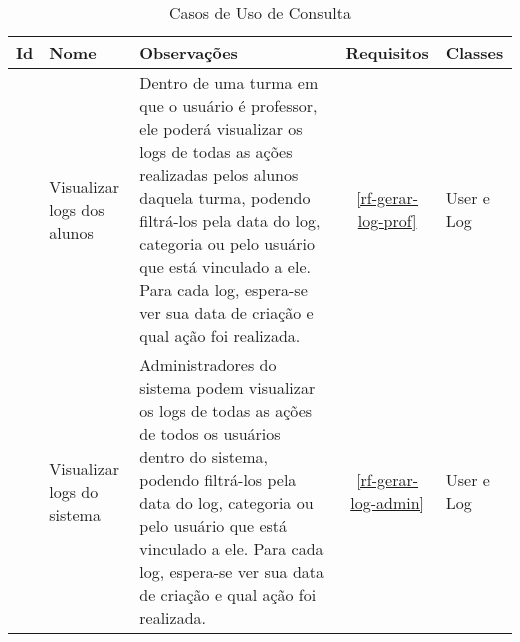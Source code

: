 \begin{table}[H]
	\centering  \vspace{0.5cm} 	\footnotesize 
	\caption{Casos de Uso de Consulta}
	\begin{tabular}{|c|p{2.3cm}|p{6.8cm}|c|p{1.8cm}|} \hline  \rowcolor[rgb]{0.8,0.8,0.8}
		
		Id & Nome   &  Observações & Requisitos   & Classes  \\ 	\hline	
		
		
		\UC\label{uc-logs-alunos} & Visualizar logs dos alunos & Dentro de uma turma em que o usuário é professor, ele poderá visualizar os logs de todas as ações realizadas pelos alunos daquela turma, podendo filtrá-los pela data do log, categoria ou pelo usuário que está vinculado a ele. Para cada log, espera-se ver sua data de criação e qual ação foi realizada.&    \ref{rf-gerar-log-prof}        & User e Log	\\ \hline
		\UC\label{uc-logs-sistema} & Visualizar logs do sistema & Administradores do sistema podem visualizar os logs de todas as ações de todos os usuários dentro do sistema, podendo filtrá-los pela data do log, categoria ou pelo usuário que está vinculado a ele. Para cada log, espera-se ver sua data de criação e qual ação foi realizada. &    \ref{rf-gerar-log-admin}        & User e Log	\\ \hline
		
	\end{tabular}
	\label{tabela-log-consulta}
\end{table}

\newpage